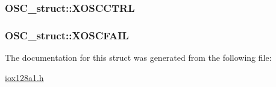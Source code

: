 \label{struct_o_s_c__struct_a58fa3d26755565f35125d6b8c190b1c4}
\hypertarget{struct_o_s_c__struct_a380ee378fe8623ecd473c6656959cdaa}{
\subsubsection[{XOSCCTRL}]{ {\bf OSC\_\-struct::XOSCCTRL}}}
\label{struct_o_s_c__struct_a380ee378fe8623ecd473c6656959cdaa}
\hypertarget{struct_o_s_c__struct_aff9bd255b74da429124802d9dc4b0b52}{
\subsubsection[{XOSCFAIL}]{ {\bf OSC\_\-struct::XOSCFAIL}}}
\label{struct_o_s_c__struct_aff9bd255b74da429124802d9dc4b0b52}


The documentation for this struct was generated from the following file:\begin{DoxyCompactItemize}
\item 
\hyperlink{iox128a1_8h}{iox128a1.h}\end{DoxyCompactItemize}
